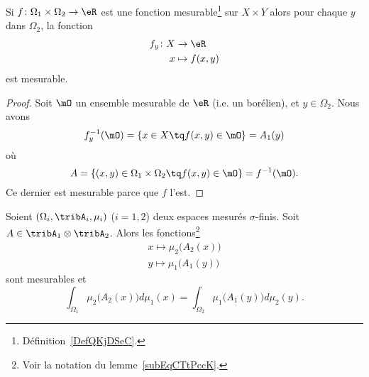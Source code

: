 \begin{corollary}
	Si \( f\colon \Omega_1\times \Omega_2\to \eR\) est une fonction mesurable\footnote{Définition~\ref{DefQKjDSeC}.} sur \( X\times Y\) alors pour chaque \( y\) dans \( \Omega_2\), la fonction
	\begin{equation}
		\begin{aligned}
			f_y\colon X & \to \eR        \\
			x           & \mapsto f(x,y)
		\end{aligned}
	\end{equation}
	est mesurable.
\end{corollary}

\begin{proof}
	Soit \( \mO\) un ensemble mesurable de \( \eR\) (i.e. un borélien), et \( y\in \Omega_2\). Nous avons
	\begin{equation}
		f_y^{-1}(\mO)=\{ x\in X\tq f(x,y)\in \mO \}=A_1(y)
	\end{equation}
	où
	\begin{equation}
		A=\{ (x,y)\in \Omega_1\times \Omega_2\tq f(x,y)\in \mO \}=f^{-1}(\mO).
	\end{equation}
	Ce dernier est mesurable parce que \( f\) l'est.
\end{proof}

\begin{theorem}    \label{ThoCCIsLhO}
	Soient \( (\Omega_i,\tribA_i,\mu_i)\) (\( i=1,2\)) deux espaces mesurés \( \sigma\)-finis. Soit \( A\in\tribA_1\otimes \tribA_2\). Alors les fonctions\footnote{Voir la notation du lemme~\ref{subEqCTtPccK}.}
	\begin{subequations}
		\begin{align}
			x\mapsto\mu_2\big( A_2(x) \big) \\
			y\mapsto\mu_1\big( A_1(y) \big)
		\end{align}
	\end{subequations}
	sont mesurables et
	\begin{equation}    \label{EqRKXwsQJ}
		\int_{\Omega_1}\mu_2\big( A_2(x) \big)d\mu_1(x)=\int_{\Omega_2}\mu_1\big( A_1(y) \big)d\mu_2(y).
	\end{equation}
\end{theorem}

